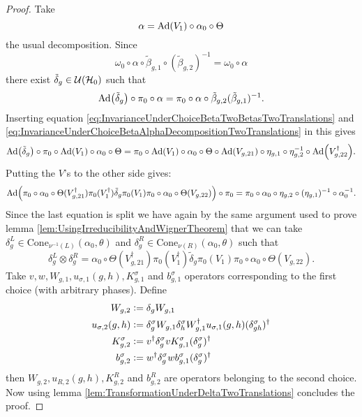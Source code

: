 \documentclass[11pt,a4paper,twoside]{article}
\numberwithin{equation}{section}
\begin{document}
\begin{proof}
		Take 
	\begin{equation}\label{eq:InvarianceUnderChoiceBetaAlphaDecompositionTwoTranslations}
		\alpha=\Ad{V_1}\circ\alpha_{0}\circ\Theta
	\end{equation}
	the usual decomposition. Since
	\begin{equation}
		\omega_0\circ\alpha\circ\tilde{\beta}_{g,1}\circ(\tilde{\beta}_{g,2})^{-1}=\omega_0\circ\alpha
	\end{equation}
	there exist $\tilde{\delta}_g\in\mathcal U(\mathcal H_0)$ such that
	\begin{equation}
		\Ad{\tilde{\delta}_g}\circ\pi_0\circ\alpha=\pi_0\circ\alpha\circ\tilde{\beta}_{g,2}(\tilde{\beta}_{g,1})^{-1}.
	\end{equation}
	Inserting equation \eqref{eq:InvarianceUnderChoiceBetaTwoBetasTwoTranslations} and \eqref{eq:InvarianceUnderChoiceBetaAlphaDecompositionTwoTranslations} in this gives
	\begin{equation}
		\Ad{\tilde{\delta}_g}\circ\pi_0\circ\Ad{V_1}\circ\alpha_0\circ\Theta=\pi_0\circ\Ad{V_1}\circ\alpha_0\circ\Theta\circ\Ad{V_{g,21}}\circ\eta_{g,1}\circ\eta_{g,2}^{-1}\circ\Ad{V_{g,22}^\dagger}.
	\end{equation}
	Putting the $V$'s to the other side gives:
	\begin{equation}
		\Ad{\pi_0\circ\alpha_0\circ\Theta(V_{g,21}^\dagger)\pi_0(V_1^\dagger)\tilde{\delta}_g\pi_0(V_1)\pi_0\circ\alpha_0\circ\Theta(V_{g,22})}\circ\pi_0=\pi_0\circ\alpha_0\circ\eta_{g,2}\circ(\eta_{g,1})^{-1}\circ\alpha_0^{-1}.
	\end{equation}
	Since the last equation is split we have again by the same argument used to prove lemma \ref{lem:UsingIrreducibilityAndWignerTheorem} that we can take $\delta_g^L\in\textrm{Cone}_{\nu^{-1}(L)}(\alpha_0,\theta)$ and $\delta_g^R\in\textrm{Cone}_{\nu(R)}(\alpha_0,\theta)$ such that
	\begin{equation}
		\delta_g^L\otimes\delta_g^R=\alpha_0\circ\Theta(V_{g,21}^\dagger)\pi_0(V_1^\dagger)\tilde{\delta}_g\pi_0(V_1)\pi_0\circ\alpha_0\circ\Theta(V_{g,22}).
	\end{equation}
	Take $v,w,W_{g,1},u_{\sigma,1}(g,h),K_{g,1}^\sigma$ and $b_{g,1}^\sigma$ operators corresponding to the first choice (with arbitrary phases). Define
	\begin{align}
		W_{g,2}&\vcentcolon=\delta_g W_{g,1}\\
		u_{\sigma,2}(g,h)&\vcentcolon= \delta_g^\sigma W_{g,1}\delta_h^\sigma W_{g,1}^\dagger u_{\sigma,1}(g,h)(\delta_{gh}^\sigma)^\dagger\\
		K^\sigma_{g,2}&\vcentcolon= v^\dagger \delta_g^\sigma v K_{g,1}^\sigma (\delta_g^\sigma)^\dagger\\
		b_{g,2}^\sigma&\vcentcolon= w^\dagger\delta^\sigma_g w b_{g,1}^\sigma (\delta^\sigma_g)^\dagger
	\end{align}
	then $W_{g,2},u_{R,2}(g,h),K^R_{g,2}$ and $b^R_{g,2}$ are operators belonging to the second choice. Now using lemma \ref{lem:TransformationUnderDeltaTwoTranslations} concludes the proof.
\end{proof}
\end{document}
